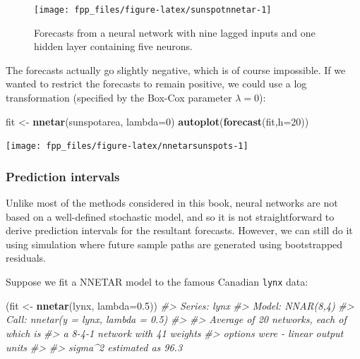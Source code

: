 \documentclass[]{book}
\newenvironment{Shaded}{\begin{snugshade}}{\end{snugshade}}
\newcommand{\CommentTok}[1]{\textcolor[rgb]{0.56,0.35,0.01}{\textit{#1}}}
\newcommand{\DataTypeTok}[1]{\textcolor[rgb]{0.13,0.29,0.53}{#1}}
\newcommand{\DecValTok}[1]{\textcolor[rgb]{0.00,0.00,0.81}{#1}}
\newcommand{\FloatTok}[1]{\textcolor[rgb]{0.00,0.00,0.81}{#1}}
\newcommand{\KeywordTok}[1]{\textcolor[rgb]{0.13,0.29,0.53}{\textbf{#1}}}
\newcommand{\NormalTok}[1]{#1}
\newcommand{\StringTok}[1]{\textcolor[rgb]{0.31,0.60,0.02}{#1}}
\begin{document}
\begin{figure}

{\centering \texttt{[image: fpp\_files/figure-latex/sunspotnnetar-1]} 

}

\caption{Forecasts from a neural network with nine lagged inputs and one hidden layer containing five neurons.}\label{fig:sunspotnnetar}
\end{figure}

The forecasts actually go slightly negative, which is of course impossible. If we wanted to restrict the forecasts to remain positive, we could use a log transformation (specified by the Box-Cox parameter \(\lambda=0\)):

\begin{Shaded}
\begin{Highlighting}[]
\NormalTok{fit <-}\StringTok{ }\KeywordTok{nnetar}\NormalTok{(sunspotarea, }\DataTypeTok{lambda=}\DecValTok{0}\NormalTok{)}
\KeywordTok{autoplot}\NormalTok{(}\KeywordTok{forecast}\NormalTok{(fit,}\DataTypeTok{h=}\DecValTok{20}\NormalTok{))}
\end{Highlighting}
\end{Shaded}

\begin{center}\texttt{[image: fpp\_files/figure-latex/nnetarsunspots-1]} \end{center}

\hypertarget{prediction-intervals-2}{%
\subsubsection*{Prediction intervals}\label{prediction-intervals-2}}

Unlike most of the methods considered in this book, neural networks are not based on a well-defined stochastic model, and so it is not straightforward to derive prediction intervals for the resultant forecasts. However, we can still do it using simulation where future sample paths are generated using bootstrapped residuals.

Suppose we fit a NNETAR model to the famous Canadian \texttt{lynx} data:

\begin{Shaded}
\begin{Highlighting}[]
\NormalTok{(fit <-}\StringTok{ }\KeywordTok{nnetar}\NormalTok{(lynx, }\DataTypeTok{lambda=}\FloatTok{0.5}\NormalTok{))}
\CommentTok{#> Series: lynx }
\CommentTok{#> Model:  NNAR(8,4) }
\CommentTok{#> Call:   nnetar(y = lynx, lambda = 0.5)}
\CommentTok{#> }
\CommentTok{#> Average of 20 networks, each of which is}
\CommentTok{#> a 8-4-1 network with 41 weights}
\CommentTok{#> options were - linear output units }
\CommentTok{#> }
\CommentTok{#> sigma^2 estimated as 96.3}
\end{Highlighting}
\end{Shaded}
\end{document}
